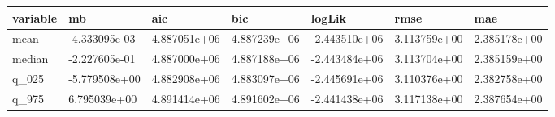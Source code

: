 \begin{table}[ht]
\centering
\begin{tabular}{lllllll}
  \hline
variable & mb & aic & bic & logLik & rmse & mae \\ 
  \hline
mean & -4.333095e-03 &  4.887051e+06 &  4.887239e+06 & -2.443510e+06 &  3.113759e+00 &  2.385178e+00 \\ 
  median & -2.227605e-01 &  4.887000e+06 &  4.887188e+06 & -2.443484e+06 &  3.113704e+00 &  2.385159e+00 \\ 
  q\_025 & -5.779508e+00 &  4.882908e+06 &  4.883097e+06 & -2.445691e+06 &  3.110376e+00 &  2.382758e+00 \\ 
  q\_975 &  6.795039e+00 &  4.891414e+06 &  4.891602e+06 & -2.441438e+06 &  3.117138e+00 &  2.387654e+00 \\ 
   \hline
\end{tabular}
\end{table}
